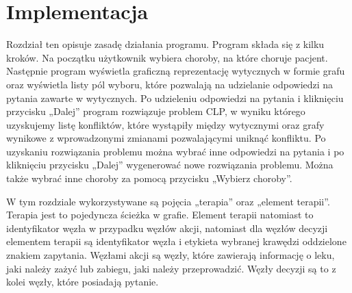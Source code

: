 \chapter{Implementacja}

Rozdział ten opisuje zasadę działania programu. Program składa się z kilku kroków. Na początku użytkownik wybiera choroby, na które choruje pacjent. Następnie program wyświetla graficzną reprezentację wytycznych w formie grafu oraz wyświetla listy pól wyboru, które pozwalają na udzielanie odpowiedzi na pytania zawarte w wytycznych. Po udzieleniu odpowiedzi na pytania i kliknięciu przycisku „Dalej” program rozwiązuje problem CLP, w wyniku którego uzyskujemy listę konfliktów, które wystąpiły między wytycznymi oraz grafy wynikowe z wprowadzonymi zmianami pozwalającymi uniknąć konfliktu. Po uzyskaniu rozwiązania problemu można wybrać inne odpowiedzi na pytania i po kliknięciu przycisku „Dalej” wygenerować nowe rozwiązania problemu. Można także wybrać inne choroby za pomocą przycisku „Wybierz choroby”.

W tym rozdziale wykorzystywane są pojęcia „terapia” oraz „element terapii”. Terapia jest to pojedyncza ścieżka w grafie. Element terapii natomiast to identyfikator węzła w przypadku węzłów akcji, natomiast dla węzłów decyzji elementem terapii są identyfikator węzła i etykieta wybranej krawędzi oddzielone znakiem zapytania. Węzłami akcji są węzły, które zawierają informację o leku, jaki należy zażyć lub zabiegu, jaki należy przeprowadzić. Węzły decyzji są to z kolei węzły, które posiadają pytanie. 

